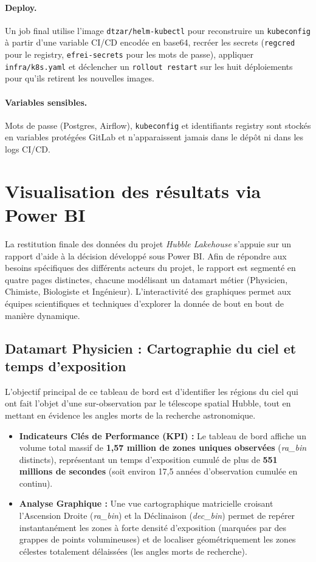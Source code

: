 \documentclass[11pt,a4paper]{article}
\begin{document}
\paragraph{Deploy.} Un job final utilise l'image \texttt{dtzar/helm-kubectl} pour reconstruire un \texttt{kubeconfig} à partir d'une variable CI/CD encodée en base64, recréer les secrets (\texttt{regcred} pour le registry, \texttt{efrei-secrets} pour les mots de passe), appliquer \texttt{infra/k8s.yaml} et déclencher un \texttt{rollout restart} sur les huit déploiements pour qu'ils retirent les nouvelles images.

\paragraph{Variables sensibles.} Mots de passe (Postgres, Airflow), \texttt{kubeconfig} et identifiants registry sont stockés en variables protégées GitLab et n'apparaissent jamais dans le dépôt ni dans les logs CI/CD.

\newpage
\section{Visualisation des résultats via Power BI}

La restitution finale des données du projet \textit{Hubble Lakehouse} s'appuie sur un rapport d'aide à la décision développé sous Power BI. Afin de répondre aux besoins spécifiques des différents acteurs du projet, le rapport est segmenté en quatre pages distinctes, chacune modélisant un datamart métier (Physicien, Chimiste, Biologiste et Ingénieur). L'interactivité des graphiques permet aux équipes scientifiques et techniques d'explorer la donnée de bout en bout de manière dynamique.

\subsection{Datamart Physicien : Cartographie du ciel et temps d'exposition}
L'objectif principal de ce tableau de bord est d'identifier les régions du ciel qui ont fait l'objet d'une sur-observation par le télescope spatial Hubble, tout en mettant en évidence les angles morts de la recherche astronomique.

\begin{itemize}
    \item \textbf{Indicateurs Clés de Performance (KPI) :} Le tableau de bord affiche un volume total massif de \textbf{1,57 million de zones uniques observées} (\textit{ra\_bin} distincts), représentant un temps d'exposition cumulé de plus de \textbf{551 millions de secondes} (soit environ 17,5 années d'observation cumulée en continu).
    \item \textbf{Analyse Graphique :} Une vue cartographique matricielle croisant l'Ascension Droite (\textit{ra\_bin}) et la Déclinaison (\textit{dec\_bin}) permet de repérer instantanément les zones à forte densité d'exposition (marquées par des grappes de points volumineuses) et de localiser géométriquement les zones célestes totalement délaissées (les angles morts de recherche).
    \end{itemize}
\end{document}
